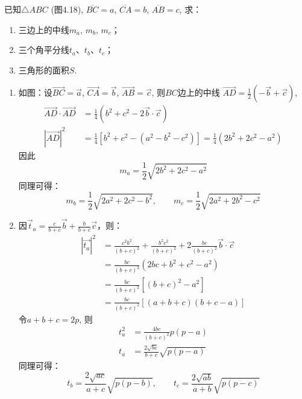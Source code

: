 \begin{example}
    已知$\triangle ABC$ (图4.18), 
$\overline{BC}=a$, $\overline{CA}=b$, $\overline{AB}=c$,
求：
\begin{enumerate}
    \item 三边上的中线$m_a$, $m_b$, $m_c$；
    \item 三个角平分线$t_a$、$t_b$、$t_c$；
\item 三角形的面积$S$.
\end{enumerate}
\end{example}

\begin{solution}
\begin{enumerate}
    \item 如图：设$\Vec{BC}=\vec{a}$, $\Vec{CA}=\vec{b}$, $\Vec{AB}=\vec{c}$, 则$BC$边上的中线
$\Vec{AD}=\frac{1}{2}(-\vec{b}+\vec{c})$,
\[\begin{split}
    \Vec{AD}\cdot \Vec{AD}&=\frac{1}{4}(b^2+c^2-2\vec{b}\cdot \vec{c})\\
    |\Vec{AD}|^2&=\frac{1}{4}[b^2+c^2-(a^2-b^2-c^2)]=\frac{1}{4}(2b^2+2c^2-a^2)
\end{split}\]
因此
\[m_a=\frac{1}{2}\sqrt{2b^2+2c^2-a^2}\]
同理可得：
\[
    m_b=\frac{1}{2}\sqrt{2a^2+2c^2-b^2},\qquad
    m_c=\frac{1}{2}\sqrt{2a^2+2b^2-c^2}
\]

\item 因$\vec{t}_a=\frac{c}{b+c}\vec{b}+\frac{b}{b+c}\vec{c}$，则：
\[\begin{split}
\left|\vec{t_{a}}\right|^{2} &=\frac{c^{2} b^{2}}{(b+c)^{2}}+\frac{b^{2} c^{2}}{(b+c)^{2}}+2 \frac{b c}{(b+c)^{2}} \vec{b} \cdot \vec{c} \\
&=\frac{b c}{(b+c)^{2}}\left(2 b c+b^{2}+c^{2}-a^{2}\right) \\
&=\frac{b c}{(b+c)^{2}}\left[(b+c)^{2}-a^{2}\right] \\
&=\frac{b c}{(b+c)^{2}}[(a+b+c)(b+c-a)]
\end{split}\]  
令$a+b+c=2p$, 则
\[\begin{split}
    t^2_a&=\frac{4bc}{(b+c)^2}p(p-a)\\
t_a&=\frac{2\sqrt{bc}}{b+c}\sqrt{p(p-a)}
\end{split}\]
同理可得：
\[
    t_b=\frac{2\sqrt{ac}}{a+c}\sqrt{p(p-b)},\qquad
    t_c=\frac{2\sqrt{ab}}{a+b}\sqrt{p(p-c)}
\]


\end{enumerate}
\end{solution}
